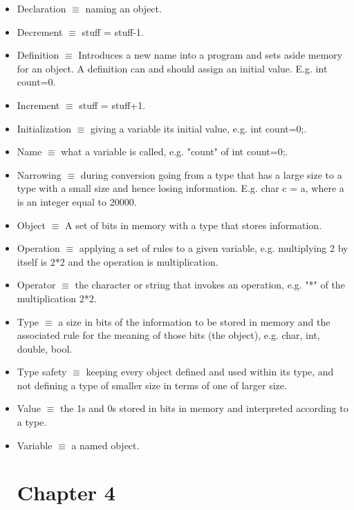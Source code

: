 \documentclass[12pt]{article}
\begin{document}
\begin{itemize}
\item Declaration $\equiv$ naming an object.

\item Decrement $\equiv$ stuff = stuff-1.

\item Definition $\equiv$ Introduces a new name into a program and sets aside memory for an object. A definition can and should assign an initial value. E.g. int count=0.

\item Increment $\equiv$ stuff = stuff+1.

\item Initialization $\equiv$ giving a variable its initial value, e.g. int count=0;.

\item Name $\equiv$ what a variable is called, e.g. "count" of int count=0;.

\item Narrowing $\equiv$ during conversion going from a type that has a large size to a type with a small size and hence losing information. E.g. char c = a, where a is an integer equal to 20000.

\item Object $\equiv$ A set of bits in memory with a type that stores information.

\item Operation $\equiv$ applying a set of rules to a given variable, e.g. multiplying 2 by itself is 2*2 and the operation is multiplication.

\item Operator $\equiv$ the character or string that invokes an operation, e.g. "*" of the multiplication 2*2.

\item Type $\equiv$ a size in bits of the information to be stored in memory and the associated rule for the meaning of those bits (the object), e.g. char, int, double, bool.

\item Type safety $\equiv$ keeping every object defined and used within its type, and not defining a type of smaller size in terms of one of larger size.

\item Value $\equiv$ the 1s and 0s stored in bits in memory and interpreted according to a type.

\item Variable $\equiv$ a named object.

\section*{Chapter 4}


\end{itemize}
\end{document}
